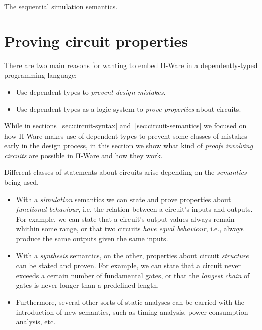             \begin{listing}[h]
                \caption{The sequential simulation semantics.\label{lst:eval-seq-core}}
            \end{listing}


    \section{Proving circuit properties}
    \label{sec:proving-circuit-properties}

        There are two main reasons for wanting to embed Π-Ware in a dependently-typed programming language:

        \begin{itemize}
            \item Use dependent types to \emph{prevent design mistakes}.
            \item Use dependent types as a logic system to \emph{prove properties} about circuits.
        \end{itemize}

        While in sections~\ref{sec:circuit-syntax} and~\ref{sec:circuit-semantics} we focused on
        how Π-Ware makes use of dependent types to prevent some classes of mistakes early in the design process,
        in this section we show what kind of \emph{proofs involving circuits} are possible in Π-Ware
        and how they work.

        Different classes of statements about circuits arise depending on the \emph{semantics} being used.

        \begin{itemize}
            \item With a \emph{simulation} semantics we can state and prove properties about
                \emph{functional behaviour}, i.e, the relation between a circuit's inputs and outputs.
                For example, we can state that a circuit's output values always remain whithin some range,
                or that two circuits \emph{have equal behaviour}, i.e., always produce the same outputs
                given the same inputs.
            \item With a \emph{synthesis} semantics, on the other, properties about circuit \emph{structure}
                can be stated and proven. For example, we can state that a circuit never
                exceeds a certain number of fundamental gates,
                or that the \emph{longest chain} of gates is never longer than a predefined length.
            \item Furthermore, several other sorts of static analyses can be carried with the
                introduction of new semantics, such as timing analysis, power consumption analysis, etc.
        \end{itemize}

